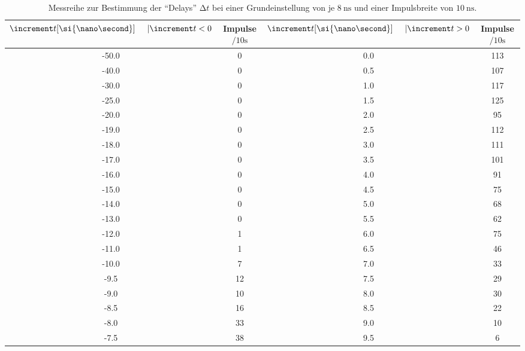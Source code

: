 \begin{table}
    \centering
    \caption{Messreihe zur Bestimmung der \enquote{Delays} $\increment t$ bei einer Grundeinstellung von je $\SI{8}{\nano\second}$ und einer Impulsbreite von $\SI{10}{\nano\second}$. } 
    \label{tab:MessreiheDelay10ns}
    \begin{tabular}{c c || c c}
        \toprule
        $\increment t [\si{\nano\second}] \hspace{0.5cm}| \increment t < 0 $ & Impulse $\si{\per{10}\second} $ & $\increment t [\si{\nano\second}] \hspace{0.5cm}|\increment t > 0 $ & Impulse $\si{\per{10}\second}$ \\
        \midrule
        -50.0    &   0      &    0.0       &   113    \\
        -40.0    &   0      &    0.5     &   107    \\
        -30.0    &   0      &    1.0       &   117    \\
        -25.0    &   0      &    1.5     &   125    \\
        -20.0    &   0      &    2.0       &   95    \\
        -19.0    &   0      &    2.5     &   112    \\
        -18.0    &   0      &    3.0       &   111    \\
        -17.0    &   0      &    3.5     &   101    \\
        -16.0    &   0      &    4.0       &   91    \\
        -15.0    &   0      &    4.5     &   75    \\
        -14.0    &   0      &    5.0       &   68    \\
        -13.0    &   0      &    5.5     &   62    \\
        -12.0    &   1      &    6.0       &   75    \\
        -11.0    &   1      &    6.5     &   46    \\
        -10.0    &   7      &    7.0       &   33    \\
        -9.5   &   12     &    7.5     &   29    \\
        -9.0     &   10     &    8.0       &   30    \\
        -8.5   &   16     &    8.5     &   22    \\
        -8.0     &   33     &    9.0       &   10    \\
        -7.5   &   38     &    9.5     &   6    \\

\end{tabular}
\end{table}
